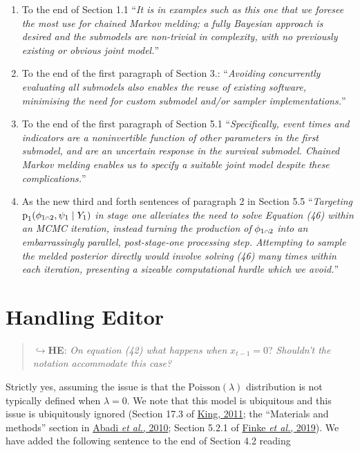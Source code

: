 \documentclass[
  10pt,
  a4paper,
]{article}
\providecommand{\tightlist}{%
  \setlength{\itemsep}{0pt}\setlength{\parskip}{0pt}}
\let\Oldcap\cap
\renewcommand{\cap}{\mathrel{\mathsmaller{\Oldcap}}}
\newcommand{\pd}{\text{p}}
\begin{document}
\begin{enumerate}
\def\labelenumi{\arabic{enumi}.}
\tightlist
\item
  To the end of Section 1.1 ``\emph{It is in examples such as this one
  that we foresee the most use for chained Markov melding; a fully
  Bayesian approach is desired and the submodels are non-trivial in
  complexity, with no previously existing or obvious joint model.}''
\item
  To the end of the first paragraph of Section 3.: ``\emph{Avoiding
  concurrently evaluating all submodels also enables the reuse of
  existing software, minimising the need for custom submodel and/or
  sampler implementations.}''
\item
  To the end of the first paragraph of Section 5.1 ``\emph{Specifically,
  event times and indicators are a noninvertible function of other
  parameters in the first submodel, and are an uncertain response in the
  survival submodel. Chained Markov melding enables us to specify a
  suitable joint model despite these complications.}''
\item
  As the new third and forth sentences of paragraph 2 in Section 5.5
  ``\emph{Targeting} \(\pd_{1}(\phi_{1 \cap 2}, \psi_{1} \mid Y_{1})\)
  \emph{in stage one alleviates the need to solve Equation (46) within
  an MCMC iteration, instead turning the production of}
  \(\phi_{1 \cap 2}\) \emph{into an embarrassingly parallel,
  post-stage-one processing step. Attempting to sample the melded
  posterior directly would involve solving (46) many times within each
  iteration, presenting a sizeable computational hurdle which we
  avoid.}''
\end{enumerate}

\hypertarget{handling-editor}{%
\section*{Handling Editor}\label{handling-editor}}

\begin{quote}
\(\hookrightarrow\)\textbf{HE}: \emph{On equation (42) what happens
when} \(x_{t - 1} = 0\)? \emph{Shouldn't the notation accommodate this
case?}
\end{quote}

Strictly yes, assuming the issue is that the \(\text{Poisson}(\lambda)\)
distribution is not typically defined when \(\lambda = 0\). We note that
this model is ubiquitous and this issue is ubiquitously ignored (Section
17.3 of \protect\hyperlink{ref-king_statistical_2011}{King, 2011}; the
``Materials and methods'' section in
\protect\hyperlink{ref-abadi_estimation_2010}{Abadi \emph{et al.},
2010}; Section 5.2.1 of
\protect\hyperlink{ref-finke_efficient_2019}{Finke \emph{et al.},
2019}). We have added the following sentence to the end of Section 4.2
reading
\end{document}
